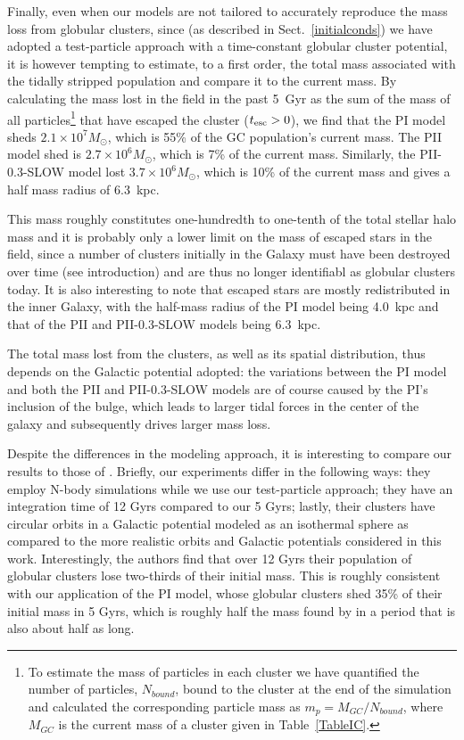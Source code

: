     Finally, even when our models are not tailored to accurately reproduce the mass loss from globular clusters, since (as described in Sect.~\ref{initialconds}) we have adopted a test-particle approach with a time-constant globular cluster potential, it is however tempting to estimate, to a first order, the total mass associated with the tidally stripped population and compare it to the current mass. By calculating the mass lost in the field in the past 5~Gyr as the sum of the mass of all particles\footnote{\label{footnote:mass}To estimate the mass of particles in each cluster we have quantified the number of particles, $N_{bound}$, bound to the cluster at the end of the simulation and calculated the corresponding particle mass as $m_p=M_{GC}/N_{bound}$, where $M_{GC}$ is the current mass of a cluster given in Table~\ref{TableIC}.} that have escaped the cluster ($t_{\rm esc}> 0$), we find that the PI model sheds $2.1\times 10^{7} M_{\odot}$, which is 55\% of the GC population's current mass. The PII model shed is $2.7\times 10^{6} M_{\odot}$, which is 7\% of the current mass. Similarly, the PII-0.3-SLOW model lost $3.7\times 10^{6} M_{\odot}$, which is 10\% of the current mass and gives a half mass radius of 6.3~kpc.

    This mass roughly constitutes one-hundredth to one-tenth of the total stellar halo mass \citep{2016ARA&A..54..529B} and it is probably only a lower limit on the mass of escaped stars in the field, since a number of clusters initially in the Galaxy must have been destroyed over time (see introduction) and are thus no longer identifiabl as globular clusters today. It is also interesting to note that escaped stars are mostly redistributed in the inner Galaxy, with the half-mass radius of the PI model being 4.0~kpc and that of the PII and PII-0.3-SLOW models being 6.3~kpc. 

    The total mass lost from the clusters, as well as its spatial distribution, thus depends on the Galactic potential adopted: the variations between the PI model and both the PII and PII-0.3-SLOW models are of course caused by the PI's inclusion of the bulge, which leads to larger tidal forces in the center of the galaxy and subsequently drives larger mass loss. 

    Despite the differences in the modeling approach, it is interesting to compare our results to those of \citet{2017MNRAS.464.2174B}. Briefly, our experiments differ in the following ways: they employ N-body simulations while we use our test-particle approach; they have an integration time of 12 Gyrs compared to our 5 Gyrs; lastly, their clusters have circular orbits in a Galactic potential modeled as an isothermal sphere as compared to the more realistic orbits and Galactic potentials considered in this work. Interestingly, the authors find that over 12 Gyrs their population of globular clusters lose two-thirds of their initial mass. This is roughly consistent with our application of the PI model, whose globular clusters shed 35\% of their initial mass in 5 Gyrs, which is roughly half the mass found by \citet{2017MNRAS.464.2174B} in a period that is also about half as long. 

